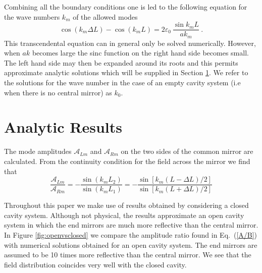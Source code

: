 \documentclass[twocolumn,english,pra,aps,superscriptaddress,floatfix]{revtex4-1}
\begin{document}
Combining all the boundary conditions one is led to the following equation
for the wave numbers $k_{m}$ of the allowed modes \cite{lang73}
\begin{equation}
\cos(k_{m} \Delta L)-\cos(k_{m} L)=2\varepsilon_{0} \ \frac{\sin k_{m} L}{a k_{m}} \ .
\label{transcendental}
\end{equation}
This transcendental equation can in general only be solved numerically. However, when $a k$ becomes large the sinc function on the right hand side becomes small. The left hand side may then be expanded around its roots and this permits approximate analytic solutions which will be supplied in Section \ref{sec:AnalyticExpressions}.
We refer to the solutions for the wave number in the case of an empty cavity system (i.e when there is no central mirror) as $k_0$.




\section{Analytic Results}
\label{sec:AnalyticExpressions}



The mode amplitudes $\mathcal{A}_{Lm}$ and $\mathcal{A}_{Rm}$ on the two sides of the common mirror are calculated.  From the continuity condition for the field across the mirror we find that   
\begin{equation}
\frac{\mathcal{A}_{Lm}}{\mathcal{A}_{Rm}}=-\frac{\sin(k_{m}L_{2})}{\sin(k_{m}L_{1})} = -\frac{\sin [k_{m} (L-\Delta L)/2]}{\sin[k_{m}(L+\Delta L)/2]} 
\label{A/B} 
\end{equation}

Throughout this paper we make use of results obtained by considering a closed cavity system.  Although not physical, the results approximate an open cavity system in which the end mirrors are much more reflective than the central mirror.   In  Figure \ref{fig:openvsclosed} we compare the amplitude ratio found in Eq.\ (\ref{A/B}) with numerical solutions obtained for an open cavity system.  The end mirrors are assumed to be 10 times more reflective than the central mirror. We see that the field distribution coincides very well with the closed cavity.

\end{document}

